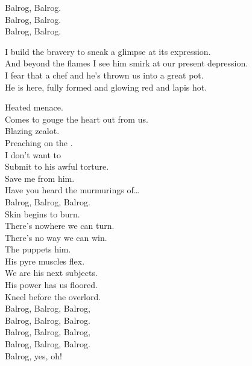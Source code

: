 Balrog, Balrog. \\
Balrog, Balrog. \\
Balrog, Balrog. \\


I build the bravery to sneak a glimpse at its expression. \\
And beyond the flames I see him smirk at our present depression. \\

I fear that  a chef and he's thrown us into a great pot. \\
He is here, fully formed and glowing red and lapis hot. \\


Heated menace. \\
Comes to gouge the heart out from us. \\
Blazing zealot. \\
Preaching on the . \\
I don't want to \\
Submit to his awful torture. \\
Save me from him. \\
Have you heard the murmurings of… \\

Balrog, Balrog, Balrog. \\

Skin begins to burn. \\
There's nowhere we can turn. \\
There's no way we can win. \\
The  puppets him. \\

His pyre muscles flex. \\
We are his next subjects. \\
His power has us floored. \\
Kneel before the overlord. \\

Balrog, Balrog, Balrog, \\
Balrog, Balrog, Balrog. \\

Balrog, Balrog, Balrog, \\
Balrog, Balrog, Balrog. \\
Balrog, yes, oh! \\


